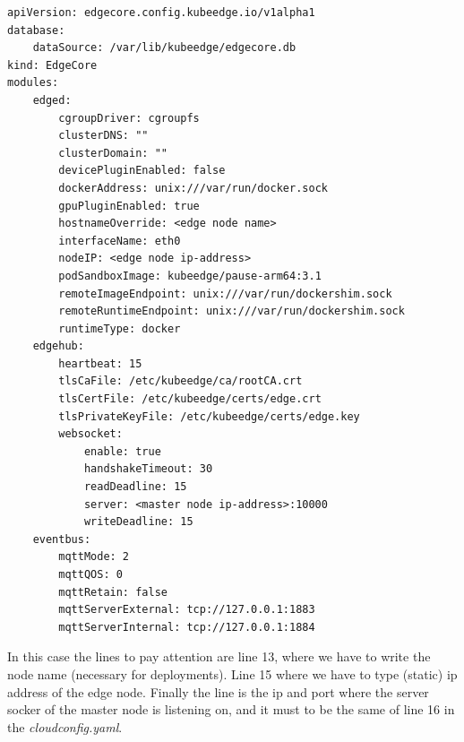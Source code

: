\begin{verbatim}
apiVersion: edgecore.config.kubeedge.io/v1alpha1
database:
    dataSource: /var/lib/kubeedge/edgecore.db
kind: EdgeCore
modules:
    edged:
        cgroupDriver: cgroupfs
        clusterDNS: ""
        clusterDomain: ""
        devicePluginEnabled: false
        dockerAddress: unix:///var/run/docker.sock
        gpuPluginEnabled: true
        hostnameOverride: <edge node name>
        interfaceName: eth0
        nodeIP: <edge node ip-address>
        podSandboxImage: kubeedge/pause-arm64:3.1
        remoteImageEndpoint: unix:///var/run/dockershim.sock
        remoteRuntimeEndpoint: unix:///var/run/dockershim.sock
        runtimeType: docker
    edgehub:
        heartbeat: 15
        tlsCaFile: /etc/kubeedge/ca/rootCA.crt
        tlsCertFile: /etc/kubeedge/certs/edge.crt
        tlsPrivateKeyFile: /etc/kubeedge/certs/edge.key
        websocket:
            enable: true
            handshakeTimeout: 30
            readDeadline: 15
            server: <master node ip-address>:10000
            writeDeadline: 15
    eventbus:
        mqttMode: 2
        mqttQOS: 0
        mqttRetain: false
        mqttServerExternal: tcp://127.0.0.1:1883
        mqttServerInternal: tcp://127.0.0.1:1884
\end{verbatim}


In this case the lines to pay attention are line 13, where we have to write the node name (necessary for deployments). Line 15 where we have to type (static) ip address of the edge node. Finally the line is the ip and port where the server socker of the master node is listening on, and it must to be the same of line 16 in the \textit{cloudconfig.yaml}.

